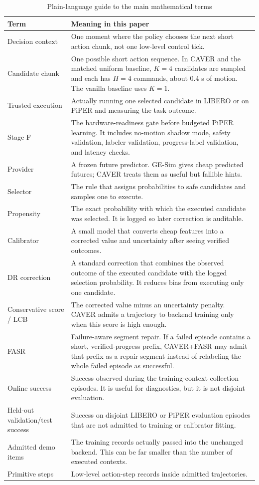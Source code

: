 \documentclass[10pt]{article}
\theoremstyle{plain}
\theoremstyle{definition}
\theoremstyle{remark}
\begin{document}
\begin{table}[H]
\centering
\small
\caption*{Plain-language guide to the main mathematical terms}
\begin{tabularx}{\linewidth}{@{}p{3.1cm}X@{}}
\toprule
Term & Meaning in this paper \\
\midrule
Decision context & One moment where the policy chooses the next short action chunk, not one low-level control tick. \\
Candidate chunk & One possible short action sequence. In CAVER and the matched uniform baseline, $K=4$ candidates are sampled and each has $H=4$ commands, about 0.4 s of motion. The vanilla baseline uses $K=1$. \\
Trusted execution & Actually running one selected candidate in LIBERO or on PiPER and measuring the task outcome. \\
Stage F & The hardware-readiness gate before budgeted PiPER learning. It includes no-motion shadow mode, safety validation, labeler validation, progress-label validation, and latency checks. \\
Provider & A frozen future predictor. GE-Sim gives cheap predicted futures; CAVER treats them as useful but fallible hints. \\
Selector & The rule that assigns probabilities to safe candidates and samples one to execute. \\
Propensity & The exact probability with which the executed candidate was selected. It is logged so later correction is auditable. \\
Calibrator & A small model that converts cheap features into a corrected value and uncertainty after seeing verified outcomes. \\
DR correction & A standard correction that combines the observed outcome of the executed candidate with the logged selection probability. It reduces bias from executing only one candidate. \\
Conservative score / LCB & The corrected value minus an uncertainty penalty. CAVER admits a trajectory to backend training only when this score is high enough. \\
FASR & Failure-aware segment repair. If a failed episode contains a short, verified-progress prefix, CAVER+FASR may admit that prefix as a repair segment instead of relabeling the whole failed episode as successful. \\
Online success & Success observed during the training-context collection episodes. It is useful for diagnostics, but it is not disjoint evaluation. \\
Held-out validation/test success & Success on disjoint LIBERO or PiPER evaluation episodes that are not admitted to training or calibrator fitting. \\
Admitted demo items & The training records actually passed into the unchanged backend. This can be far smaller than the number of executed contexts. \\
Primitive steps & Low-level action-step records inside admitted trajectories. \\
\bottomrule
\end{tabularx}
\end{table}
\end{document}
